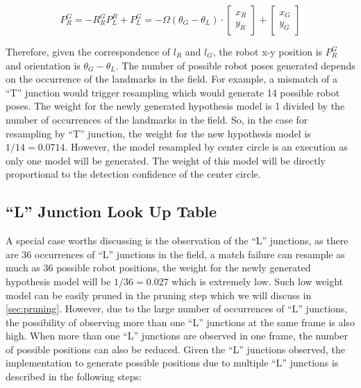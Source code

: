 \begin{equation}
\label{eq:reverseTrans5}
	P_R^G=
	-R_R^G P_L^R +  P_L^G=
   -\Omega(\theta_{G} - \theta_{L}) \cdot
\begin{bmatrix}
  x_R\\
  y_R
\end{bmatrix}
+
\begin{bmatrix}
  x_G\\
  y_G
\end{bmatrix}
\end{equation}

Therefore, given the correspondence of $l_R$ and $l_G$,  the robot x-y position is $P_R^G$ and orientation is $\theta_{G} - \theta_{L}$. The number of possible robot poses generated depends on the occurrence of the landmarks in the field. For example, a mismatch of a ``T'' junction would trigger resampling which would generate 14 possible robot poses. The weight for the newly generated hypothesis model is 1 divided by the number of occurrences of the landmarks in the field. So, in the case for resampling by ``T'' junction, the weight for the new hypothesis model is $1/14 = 0.0714$. However, the model resampled by center circle is an execution as only one model will be generated. The weight of this model will be directly proportional to the detection confidence of the center circle.

\subsection{``L'' Junction Look Up Table}
\label{sub:Junction Look Up Table}
A special case worths discussing is the observation of the ``L'' junctions, as there are 36 occurrences of ``L'' junctions in the field, a match failure can resample as much as 36 possible robot positions, the weight for the newly generated hypothesis model will be $1/36=0.027$ which is extremely low. Such low weight model can be easily pruned in the pruning step which we will discuss in \autoref{sec:pruning}. However, due to the large number of occurrences of ``L'' junctions, the possibility of observing more than one ``L'' junctions at the same frame is also high. When more than one ``L'' junctions are observed in one frame, the number of possible positions can also be reduced. Given the ``L'' junctions observed, the implementation to generate possible positions due to multiple ``L'' junctions is described in the following steps:

